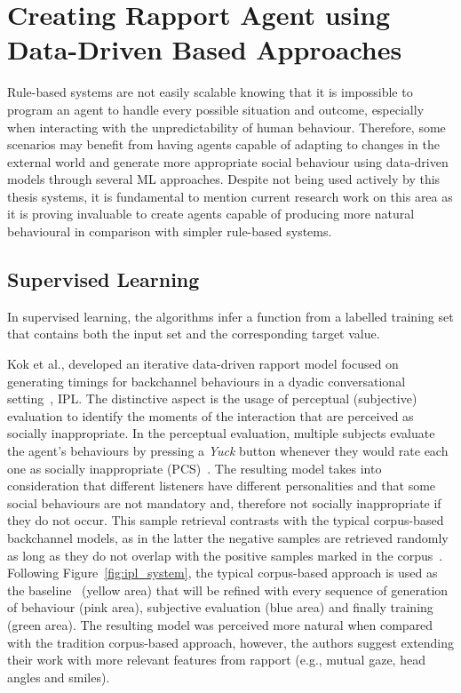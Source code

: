 \section{Creating Rapport Agent using Data-Driven Based Approaches}
\label{sec:datadrivenbasedAgents}

Rule-based systems are not easily scalable knowing that it is impossible to program an agent to handle every possible situation and outcome, especially when interacting with the unpredictability of human behaviour. Therefore, some scenarios may benefit from having agents capable of adapting to changes in the external world and generate more appropriate social behaviour using data-driven models through several \ac{ML} approaches. Despite not being used actively by this thesis systems, it is fundamental to mention current research work on this area as it is proving invaluable to create agents capable of producing more natural behavioural in comparison with simpler rule-based systems.

\subsection{Supervised Learning}
In supervised learning, the algorithms infer a function from a labelled training set that contains both the input set and the corresponding target value. 

Kok et al., developed an iterative data-driven rapport model focused on generating timings for backchannel behaviours in a dyadic conversational setting~\cite{Kok2012}, \ac{IPL}. The distinctive aspect is the usage of perceptual (subjective) evaluation to identify the moments of the interaction that are perceived as socially inappropriate. In the perceptual evaluation, multiple subjects evaluate the agent's behaviours by pressing a \textit{Yuck} button whenever they would rate each one as socially inappropriate (\ac{PCS})~\cite{Huang2010, Poppe2011}. The resulting model takes into consideration that different listeners have different personalities and that some social behaviours are not mandatory and, therefore not socially inappropriate if they do not occur. This sample retrieval contrasts with the typical corpus-based backchannel models, as in the latter the negative samples are retrieved randomly as long as they do not overlap with the positive samples marked in the corpus~\cite{Kok2012}. Following Figure~\ref{fig:ipl_system}, the typical corpus-based approach is used as the baseline~\cite{DeKok2011} (yellow area) that will be refined with every sequence of generation of behaviour (pink area), subjective evaluation (blue area) and finally training (green area). The resulting model was perceived more natural when compared with the tradition corpus-based approach, however, the authors suggest extending their work with more relevant features from rapport (e.g., mutual gaze, head angles and smiles).

